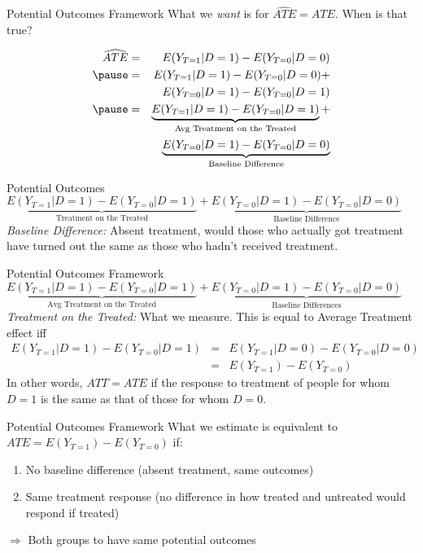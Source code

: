 \documentclass[11pt,handout]{beamer}
\begin{document}
\begin{frame}[c]{Potential Outcomes Framework}
What we \emph{want} is for $\widehat{ATE} = ATE$. When is that true?

  \begin{eqnarray}
  \widehat{ATE} &=&E(Y_{T=1}|D=1) - E(Y_{T=0}|D=0) \nonumber \\
                \pause &=&E(Y_{T=1}|D=1) - E(Y_{T=0}|D=0) + \nonumber \\
                &&E(Y_{T=0}|D=1) - E(Y_{T=0}|D=1)  \nonumber \\
               \pause &=& \underbrace{E(Y_{T=1}|D=1) - E(Y_{T=0}|D=1)}_{\text{Avg Treatment on the Treated}} + \nonumber \\ &&\underbrace{E(Y_{T=0}|D=1) - E(Y_{T=0}|D=0)}_{\text{Baseline Difference}} \nonumber
  \end{eqnarray}
\end{frame}

\begin{frame}[c]{Potential Outcomes}
$\underbrace{E(Y_{T=1}|D=1) - E(Y_{T=0}|D=1)}_{\text{Treatment on the Treated}} + \underbrace{E(Y_{T=0}|D=1) - E(Y_{T=0}|D=0)}_{\text{Baseline Difference}}$ \\
\vspace*{1cm}
\emph{Baseline Difference:} Absent treatment, would those who actually got treatment have turned out the same as those who hadn't received treatment.
\end{frame}

\begin{frame}[c]{Potential Outcomes Framework}
$\underbrace{E(Y_{T=1}|D=1) - E(Y_{T=0}|D=1)}_{\text{Avg Treatment on the Treated}} + \underbrace{E(Y_{T=0}|D=1) - E(Y_{T=0}|D=0)}_{\text{Baseline Differences}}$ \\
\vspace*{1cm}
\emph{Treatment on the Treated:} What we measure. This is equal to Average Treatment effect iff
\begin{eqnarray}
E(Y_{T=1}|D=1) - E(Y_{T=0}|D=1) &=& E(Y_{T=1}|D=0) - E(Y_{T=0}|D=0)\nonumber \\
                                &=& E(Y_{T=1}) - E(Y_{T=0})\nonumber
\end{eqnarray}
In other words, $ATT = ATE$ if the response to treatment of people for whom $D=1$ is the same as that of those for whom $D=0$.
\end{frame}

\begin{frame}[c]{Potential Outcomes Framework}
What we estimate is equivalent to $ATE = E(Y_{T=1}) - E(Y_{T=0})$ if:

\begin{enumerate}
  \item No baseline difference (absent treatment, same outcomes)
  \item Same treatment response (no difference in how treated and untreated would respond if treated)
\end{enumerate}
$\Rightarrow$ Both groups to have \alert{same potential outcomes}
\end{frame}
\end{document}
